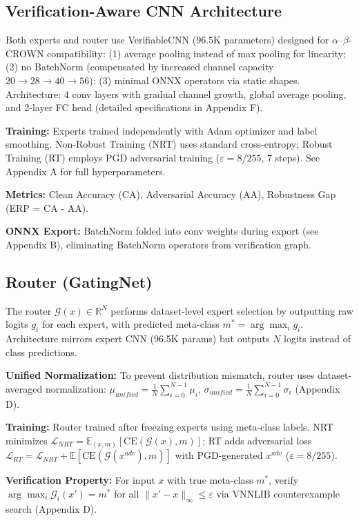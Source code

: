 \documentclass[11pt,a4paper]{article}
\begin{document}
\subsection{Verification-Aware CNN Architecture}

Both experts and router use VerifiableCNN (96.5K parameters) designed for $\alpha$--$\beta$-CROWN compatibility: (1) average pooling instead of max pooling for linearity; (2) no BatchNorm (compensated by increased channel capacity $20 \to 28 \to 40 \to 56$); (3) minimal ONNX operators via static shapes. Architecture: 4 conv layers with gradual channel growth, global average pooling, and 2-layer FC head (detailed specifications in Appendix F).

\textbf{Training:} Experts trained independently with Adam optimizer and label smoothing. Non-Robust Training (NRT) uses standard cross-entropy; Robust Training (RT) employs PGD adversarial training ($\varepsilon = 8/255$, 7 steps). See Appendix A for full hyperparameters.

\textbf{Metrics:} Clean Accuracy (CA), Adversarial Accuracy (AA), Robustness Gap (ERP = CA - AA).

\textbf{ONNX Export:} BatchNorm folded into conv weights during export (see Appendix B), eliminating BatchNorm operators from verification graph.

\subsection{Router (GatingNet)}

The router $\mathcal{G}(x) \in \mathbb{R}^N$ performs dataset-level expert selection by outputting raw logits $g_i$ for each expert, with predicted meta-class $m^* = \arg\max_i g_i$. Architecture mirrors expert CNN (96.5K params) but outputs $N$ logits instead of class predictions.

\textbf{Unified Normalization:} To prevent distribution mismatch, router uses dataset-averaged normalization: $\mu_{unified} = \frac{1}{N} \sum_{i=0}^{N-1} \mu_i$, $\sigma_{unified} = \frac{1}{N} \sum_{i=0}^{N-1} \sigma_i$ (Appendix D).

\textbf{Training:} Router trained after freezing experts using meta-class labels. NRT minimizes $\mathcal{L}_{NRT} = \mathbb{E}_{(x,m)}[\text{CE}(\mathcal{G}(x), m)]$; RT adds adversarial loss $\mathcal{L}_{RT} = \mathcal{L}_{NRT} + \mathbb{E}[\text{CE}(\mathcal{G}(x^{adv}), m)]$ with PGD-generated $x^{adv}$ ($\varepsilon = 8/255$).

\textbf{Verification Property:} For input $x$ with true meta-class $m^*$, verify $\arg\max_i \mathcal{G}_i(x') = m^*$ for all $\|x' - x\|_\infty \leq \varepsilon$ via VNNLIB counterexample search (Appendix D).
\end{document}
